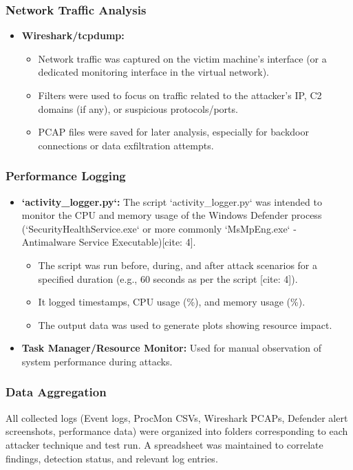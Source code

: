 \documentclass[11pt]{article}
\begin{document}
	\subsubsection{Network Traffic Analysis}
	\begin{itemize}
		\item \textbf{Wireshark/tcpdump:}
		\begin{itemize}
			\item Network traffic was captured on the victim machine's interface (or a dedicated monitoring interface in the virtual network).
			\item Filters were used to focus on traffic related to the attacker's IP, C2 domains (if any), or suspicious protocols/ports.
			\item PCAP files were saved for later analysis, especially for backdoor connections or data exfiltration attempts.
		\end{itemize}
	\end{itemize}
	
	\subsubsection{Performance Logging}
	\begin{itemize}
		\item \textbf{`activity_logger.py`:} The script `activity_logger.py` was intended to monitor the CPU and memory usage of the Windows Defender process (`SecurityHealthService.exe` or more commonly `MsMpEng.exe` - Antimalware Service Executable)[cite: 4].
		\begin{itemize}
			\item The script was run before, during, and after attack scenarios for a specified duration (e.g., 60 seconds as per the script [cite: 4]).
			\item It logged timestamps, CPU usage (\%), and memory usage (\%).
			\item The output data was used to generate plots showing resource impact.
		\end{itemize}
		\item \textbf{Task Manager/Resource Monitor:} Used for manual observation of system performance during attacks.
	\end{itemize}
	\subsubsection{Data Aggregation}
	All collected logs (Event logs, ProcMon CSVs, Wireshark PCAPs, Defender alert screenshots, performance data) were organized into folders corresponding to each attacker technique and test run. A spreadsheet was maintained to correlate findings, detection status, and relevant log entries.
	
\end{document}
